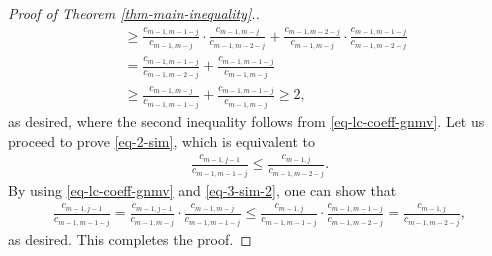 \documentclass[10pt,a4paper]{amsart}
\begin{document}
\begin{proof}[Proof of Theorem \ref{thm-main-inequality}.]
\begin{align*}
    & 
   \ge \frac{c_{m-1,m-1-j}}{c_{m-1,m-j}}\cdot\frac{c_{m-1,m-j}}{c_{m-1,m-2-j}}+\frac{c_{m-1,m-2-j}}{c_{m-1,m-j}}\cdot\frac{c_{m-1,m-1-j}}{c_{m-1,m-2-j}} \\[5pt]
     & =\frac{c_{m-1,m-1-j}}{c_{m-1,m-2-j}}+\frac{c_{m-1,m-1-j}}{c_{m-1,m-j}}\\[5pt]
     & \geq \frac{c_{m-1,m-j}}{c_{m-1,m-1-j}}+\frac{c_{m-1,m-1-j}}{c_{m-1,m-j}}\geq 2,
 \end{align*}
 as desired, where the second inequality follows from  \eqref{eq-lc-coeff-gnmv}. 
Let us proceed to prove \eqref{eq-2-sim}, which is equivalent to
\begin{align*}%
\frac{c_{m-1,j-1}} {c_{m-1,m-1-j}}
\le
\frac{c_{m-1,j}}{c_{m-1,m-2-j}}.
\end{align*}
By using \eqref{eq-lc-coeff-gnmv} and \eqref{eq-3-sim-2}, one can show that
\begin{align*}
\frac{c_{m-1,j-1}} {c_{m-1,m-1-j}}
=\frac{c_{m-1,j-1}}{c_{m-1,m-j}} \cdot \frac{c_{m-1,m-j}}{c_{m-1,m-1-j}} 
\le
\frac{c_{m-1,j}}{c_{m-1,m-1-j}} \cdot \frac{c_{m-1,m-1-j}}{c_{m-1,m-2-j}}
=\frac{c_{m-1,j}}{c_{m-1,m-2-j}},
\end{align*}
as desired.
This completes the proof.
\end{proof}
\end{document}
